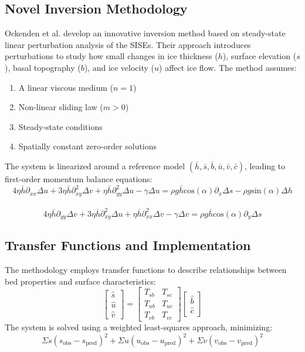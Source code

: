 \subsection*{Novel Inversion Methodology}

Ockenden et al. develop an innovative inversion method based on steady-state linear perturbation analysis of the SISEs. Their approach introduces perturbations to study how small changes in ice thickness ($h$), surface elevation ($s$), basal topography ($b$), and ice velocity ($u$) affect ice flow. The method assumes:
\begin{enumerate}
\item A linear viscous medium ($n=1$)
\item Non-linear sliding law ($m>0$)
\item Steady-state conditions
\item Spatially constant zero-order solutions
\end{enumerate}

The system is linearized around a reference model $(\bar{h}, \bar{s}, \bar{b}, \bar{u}, \bar{v}, \bar{c})$, leading to first-order momentum balance equations:
\begin{equation}
4 \eta \bar{h} \partial_{xx} \Delta u + 3 \eta \bar{h} \partial_{xy}^{2} \Delta v + \eta \bar{h} \partial_{yy}^{2}\Delta u -\gamma \Delta u  = \rho g \bar{h}\mathrm{cos}(\alpha) \partial_x \Delta s - \rho g \mathrm{sin}(\alpha)\Delta h
\end{equation}\\
\begin{equation}
4 \eta \bar{h} \partial_{yy} \Delta v + 3 \eta \bar{h} \partial_{xy}^{2} \Delta u + \eta \bar{h} \partial_{xx}^{2}\Delta v -\gamma \Delta v  = \rho g \bar{h}\mathrm{cos}(\alpha) \partial_y \Delta s
\end{equation}

\subsection*{Transfer Functions and Implementation}

The methodology employs transfer functions to describe relationships between bed properties and surface characteristics:
$$\begin{bmatrix}
\hat{s} \\
\hat{u} \\
\hat{v}
\end{bmatrix} =\begin{bmatrix}
T_{sb} & T_{sc} \\
T_{ub} & T_{uc} \\
T_{vb} & T_{vc}
\end{bmatrix}
\begin{bmatrix}
\hat{b}\\
\hat{c}
\end{bmatrix}$$
The system is solved using a weighted least-squares approach, minimizing:
\begin{equation}
\Sigma s(s_{\mathrm{obs}} - s_{\mathrm{pred}})^2 + \Sigma u(u_{\mathrm{obs}} - u_{\mathrm{pred}})^2 + \Sigma v(v_{\mathrm{obs}} - v_{\mathrm{pred}})^2
\end{equation}

